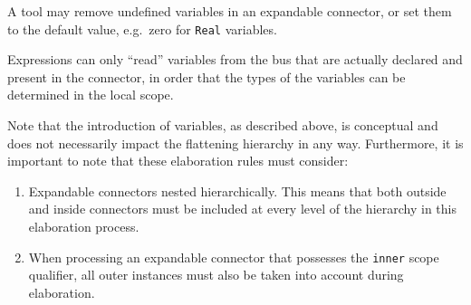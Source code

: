 \begin{nonnormative}
A tool may remove undefined variables in an expandable connector, or set them to the default value, e.g.\ zero for \lstinline!Real! variables.
\end{nonnormative}

\begin{nonnormative}
Expressions can only ``read'' variables from the bus that are actually declared and present in the connector, in order that the types of the variables can be determined in the local scope.
\end{nonnormative}

\begin{nonnormative}
Note that the introduction of variables, as described above, is conceptual and does not necessarily impact the flattening hierarchy in any way.
Furthermore, it is important to note that these elaboration rules must consider:
\begin{enumerate}
\item
  Expandable connectors nested hierarchically.
  This means that  both outside and inside connectors must be included at every level of the hierarchy in this elaboration process.
\item
  When processing an expandable connector that possesses the \lstinline!inner! scope qualifier, all outer instances must also be taken into account during elaboration.
\end{enumerate}
\end{nonnormative}

